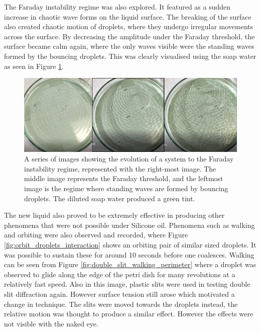 The Faraday instability regime was also explored. It featured as a sudden increase in chaotic wave forms on the liquid surface. The breaking of the surface also created chaotic motion of droplets, where they undergo irregular movements across the surface. By decreasing the amplitude under the Faraday threshold, the surface became calm again, where the only waves visible were the standing waves formed by the bouncing droplets. This was clearly visualised using the soap water as seen in Figure \ref{fig:faraday_inst_regime}.

\begin{figure}[htb]
\includegraphics[width=\textwidth]{prototype/exp_rep_imgs/Faraday_inst_regime.jpg}
\centering
\caption{A series of images showing the evolution of a system to the Faraday instability regime, represented with the right-most image. The middle image represents the Faraday threshold, and the leftmost image is the regime where standing waves are formed by bouncing droplets. The diluted soap water produced a green tint.}
\centering
\label{fig:faraday_inst_regime}
\end{figure}

The new liquid also proved to be extremely effective in producing other phenomena that were not possible under Silicone oil. Phenomena such as walking and orbiting were also observed and recorded, where Figure \ref{fig:orbit_droplets_interaction} shows an orbiting pair of similar sized droplets. It  was possible to sustain these for around 10 seconds before one coalesces. Walking can be seen from Figure \ref{fig:double_slit_walking_perimeter} where a droplet was observed to glide along the edge of the petri dish for many revolutions at a relatively fast speed. Also in this image, plastic slits were used in testing double slit diffraction again. However surface tension still arose which motivated a change in technique. The slits were moved towards the droplets instead, the relative motion was thought to produce a similar effect. However the effects were not visible with the naked eye.

